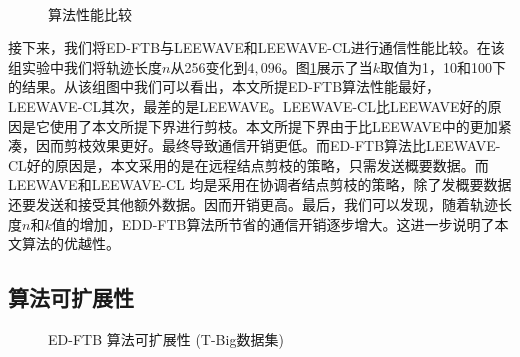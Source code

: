 \begin{figure}[t]
\centering
{}
\\
\caption{算法性能比较}
\label{fig:costCmp}
\end{figure}
接下来，我们将ED-FTB与LEEWAVE和LEEWAVE-CL进行通信性能比较。在该组实验中我们将轨迹长度$n$从256变化到$4,096$。图\ref{fig:costCmp}展示了当$k$取值为1，10和100下的结果。从该组图中我们可以看出，本文所提ED-FTB算法性能最好，LEEWAVE-CL其次，最差的是LEEWAVE。LEEWAVE-CL比LEEWAVE好的原因是它使用了本文所提下界进行剪枝。本文所提下界由于比LEEWAVE中的更加紧凑，因而剪枝效果更好。最终导致通信开销更低。而ED-FTB算法比LEEWAVE-CL好的原因是，本文采用的是在远程结点剪枝的策略，只需发送概要数据。而LEEWAVE和LEEWAVE-CL 均是采用在协调者结点剪枝的策略，除了发概要数据还要发送和接受其他额外数据。因而开销更高。最后，我们可以发现，随着轨迹长度$n$和$k$值的增加，EDD-FTB算法所节省的通信开销逐步增大。这进一步说明了本文算法的优越性。

\subsection{算法可扩展性}
\begin{figure} [t]
	\centering
	\caption{ED-FTB 算法可扩展性 {(T-Big数据集)}}
	\label{fig:EDScalability}
\end{figure}

